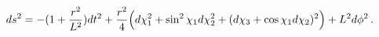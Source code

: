 \begin{equation}
\label{D3testdualan}
ds^2=- (1+\frac{r^2}{L^2}) dt^2+\frac{r^2}{4}\Bigl(d\chi_1^2+\sin^2{\chi_1}d\chi_2^2+
(d\chi_3+\cos{\chi_1}d\chi_2)^2\Bigr)+L^2d\phi^2\, .
\end{equation}

